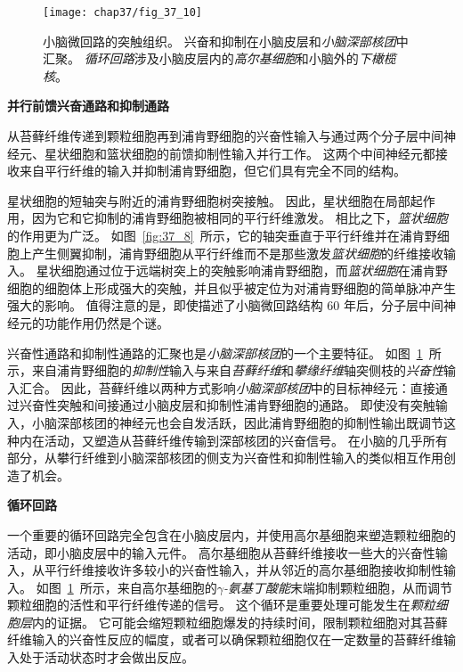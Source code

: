 \begin{figure}[htbp]
	\centering
	\texttt{[image: chap37/fig\_37\_10]}
	\caption{小脑微回路的突触组织。
		兴奋和抑制在小脑皮层和\textit{小脑深部核团}中汇聚。
		\textit{循环回路}涉及小脑皮层内的\textit{高尔基细胞}和小脑外的\textit{下橄榄核}\cite{raymond1996cerebellum}。}
	\label{fig:37_10}
\end{figure}


\textbf{并行前馈兴奋通路和抑制通路}


从苔藓纤维传递到颗粒细胞再到浦肯野细胞的兴奋性输入与通过两个分子层中间神经元、星状细胞和篮状细胞的前馈抑制性输入并行工作。
这两个中间神经元都接收来自平行纤维的输入并抑制浦肯野细胞，但它们具有完全不同的结构。


星状细胞的短轴突与附近的浦肯野细胞树突接触。
因此，星状细胞在局部起作用，因为它和它抑制的浦肯野细胞被相同的平行纤维激发。
相比之下，\textit{篮状细胞}的作用更为广泛。
如图~\ref{fig:37_8}~所示，它的轴突垂直于平行纤维并在浦肯野细胞上产生侧翼抑制，浦肯野细胞从平行纤维而不是那些激发\textit{篮状细胞}的纤维接收输入。
星状细胞通过位于远端树突上的突触影响浦肯野细胞，而\textit{篮状细胞}在浦肯野细胞的细胞体上形成强大的突触，并且似乎被定位为对浦肯野细胞的简单脉冲产生强大的影响。
值得注意的是，即使描述了小脑微回路结构 60 年后，分子层中间神经元的功能作用仍然是个谜。


兴奋性通路和抑制性通路的汇聚也是\textit{小脑深部核团}的一个主要特征。
如图~\ref{fig:37_10}~所示，来自浦肯野细胞的\textit{抑制性}输入与来自\textit{苔藓纤维}和\textit{攀缘纤维}轴突侧枝的\textit{兴奋性}输入汇合。
因此，苔藓纤维以两种方式影响\textit{小脑深部核团}中的目标神经元：直接通过兴奋性突触和间接通过小脑皮层和抑制性浦肯野细胞的通路。
即使没有突触输入，小脑深部核团的神经元也会自发活跃，因此浦肯野细胞的抑制性输出既调节这种内在活动，又塑造从苔藓纤维传输到深部核团的兴奋信号。
在小脑的几乎所有部分，从攀行纤维到小脑深部核团的侧支为兴奋性和抑制性输入的类似相互作用创造了机会。



\textbf{循环回路}

一个重要的循环回路完全包含在小脑皮层内，并使用高尔基细胞来塑造颗粒细胞的活动，即小脑皮层中的输入元件。
高尔基细胞从苔藓纤维接收一些大的兴奋性输入，从平行纤维接收许多较小的兴奋性输入，并从邻近的高尔基细胞接收抑制性输入。
如图~\ref{fig:37_10}~所示，来自高尔基细胞的\textit{$\gamma$-氨基丁酸能}末端抑制颗粒细胞，从而调节颗粒细胞的活性和平行纤维传递的信号。
这个循环是重要处理可能发生在\textit{颗粒细胞层}内的证据。
它可能会缩短颗粒细胞爆发的持续时间，限制颗粒细胞对其苔藓纤维输入的兴奋性反应的幅度，或者可以确保颗粒细胞仅在一定数量的苔藓纤维输入处于活动状态时才会做出反应。


